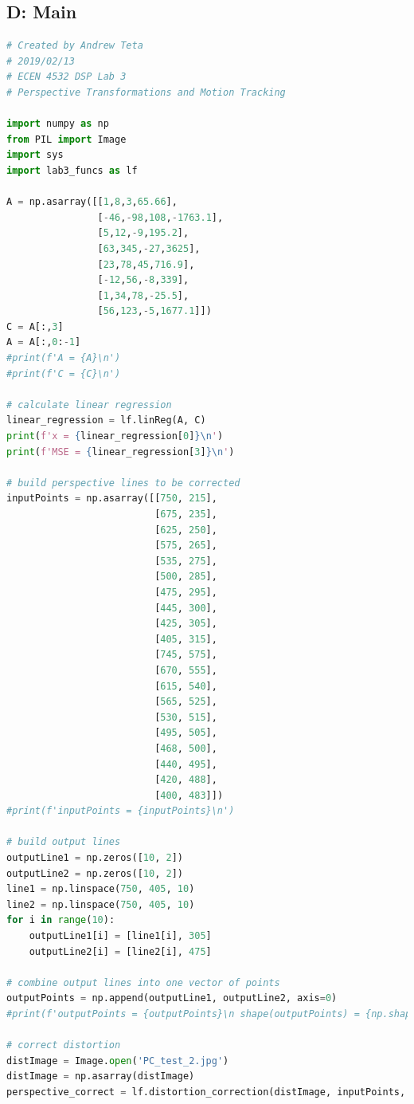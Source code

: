 \documentclass[11pt,a4paper]{article}
\begin{document}
\subsection{D: Main}
\begin{lstlisting}[language=Python]
# Created by Andrew Teta
# 2019/02/13
# ECEN 4532 DSP Lab 3
# Perspective Transformations and Motion Tracking

import numpy as np
from PIL import Image
import sys
import lab3_funcs as lf

A = np.asarray([[1,8,3,65.66],
                [-46,-98,108,-1763.1],
                [5,12,-9,195.2],
                [63,345,-27,3625],
                [23,78,45,716.9],
                [-12,56,-8,339],
                [1,34,78,-25.5],
                [56,123,-5,1677.1]])
C = A[:,3]
A = A[:,0:-1]
#print(f'A = {A}\n')
#print(f'C = {C}\n')

# calculate linear regression
linear_regression = lf.linReg(A, C)
print(f'x = {linear_regression[0]}\n')
print(f'MSE = {linear_regression[3]}\n')

# build perspective lines to be corrected
inputPoints = np.asarray([[750, 215],
                          [675, 235],
                          [625, 250],
                          [575, 265],
                          [535, 275],
                          [500, 285],
                          [475, 295],
                          [445, 300],
                          [425, 305],
                          [405, 315],
                          [745, 575],
                          [670, 555],
                          [615, 540],
                          [565, 525],
                          [530, 515],
                          [495, 505],
                          [468, 500],
                          [440, 495],
                          [420, 488],
                          [400, 483]])
#print(f'inputPoints = {inputPoints}\n')

# build output lines
outputLine1 = np.zeros([10, 2])
outputLine2 = np.zeros([10, 2])
line1 = np.linspace(750, 405, 10)
line2 = np.linspace(750, 405, 10)
for i in range(10):
    outputLine1[i] = [line1[i], 305]
    outputLine2[i] = [line2[i], 475]

# combine output lines into one vector of points
outputPoints = np.append(outputLine1, outputLine2, axis=0)
#print(f'outputPoints = {outputPoints}\n shape(outputPoints) = {np.shape(outputPoints)}\n')

# correct distortion
distImage = Image.open('PC_test_2.jpg')
distImage = np.asarray(distImage)
perspective_correct = lf.distortion_correction(distImage, inputPoints, outputPoints)


\end{lstlisting}
\end{document}
